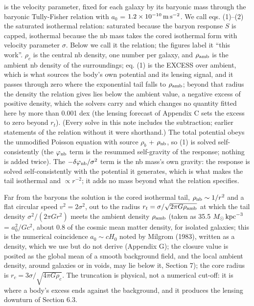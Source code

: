 \documentclass[
  10pt,
]{article}
\begin{document}
is the velocity parameter, fixed for each galaxy by its baryonic mass through the baryonic Tully-Fisher relation with $a_0$ = $1.2\times10^{-10}\,{\rm m\,s^{-2}}$. We call eqs. (1)--(2) the saturated isothermal relation: saturated because the baryon response $S$ is capped, isothermal because the nb mass takes the cored isothermal form with velocity parameter $\sigma$. Below we call it the relation; the figures label it ``this work''. $\rho_c$ is the central nb density, one number per galaxy, and $\rho_{\rm amb}$ is the ambient nb density of the surroundings; eq. (1) is the EXCESS over ambient, which is what sources the body's own potential and its lensing signal, and it passes through zero where the exponential tail falls to $\rho_{\rm amb}$; beyond that radius the density the relation gives lies below the ambient value, a negative excess of positive density, which the solvers carry and which changes no quantity fitted here by more than 0.001 dex (the lensing forecast of Appendix C sets the excess to zero beyond $r_t$). (Every solve in this note includes the subtraction; earlier statements of the relation without it were shorthand.) The total potential obeys the unmodified Poisson equation with source $\rho_b$ + $\rho_{\rm nb}$, so (1) is solved self-consistently (the $\varphi_{\rm nb}$ term is the resummed self-gravity of the response; nothing is added twice). The $-\delta\varphi_{\rm nb}/\sigma^2$ term is the nb mass's own gravity: the response is solved self-consistently with the potential it generates, which is what makes the tail isothermal and $\propto r^{-2}$; it adds no mass beyond what the relation specifies.

Far from the baryons the solution is the cored isothermal tail, $\rho_{\rm nb}\sim 1/r^2$ and a flat circular speed $v^2=2\sigma^2$, out to the radius $r_t=\sigma/\sqrt{2\pi G\rho_{\rm amb}}$ at which the tail density $\sigma^2/(2\pi G r^2)$ meets the ambient density $\rho_{\rm amb}$ (taken as 35.5 $M_\odot\,{\rm kpc}^{-3}$ = $a_0^2/Gc^2$, about 0.8 of the cosmic mean matter density, for isolated galaxies; this is the numerical coincidence $a_0\sim cH_0$ noted by Milgrom (1983), written as a density, which we use but do not derive (Appendix G); the closure value is posited as the global mean of a smooth background field, and the local ambient density, around galaxies or in voids, may lie below it, Section 7); the core radius is $r_c=3\sigma/\sqrt{4\pi G\rho_c}$. The truncation is physical, not a numerical cut-off: it is where a body's excess ends against the background, and it produces the lensing downturn of Section 6.3.
\end{document}
